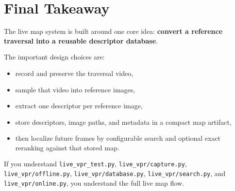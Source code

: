 \documentclass[11pt]{article}
\newcommand{\file}[1]{\texttt{#1}}
\begin{document}
\section{Final Takeaway}
The live map system is built around one core idea: \textbf{convert a reference traversal into a reusable descriptor database}.

The important design choices are:

\begin{itemize}[leftmargin=*]
  \item record and preserve the traversal video,
  \item sample that video into reference images,
  \item extract one descriptor per reference image,
  \item store descriptors, image paths, and metadata in a compact map artifact,
  \item then localize future frames by configurable search and optional exact reranking against that stored map.
\end{itemize}

If you understand \file{live\_vpr\_test.py}, \file{live\_vpr/capture.py}, \file{live\_vpr/offline.py}, \file{live\_vpr/database.py}, \file{live\_vpr/search.py}, and \file{live\_vpr/online.py}, you understand the full live map flow.
\end{document}
